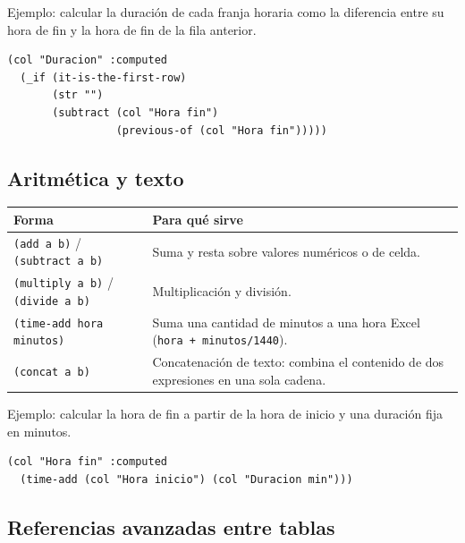\documentclass[12pt,a4paper]{report}
\begin{document}
Ejemplo: calcular la duración de cada franja horaria como la diferencia
entre su hora de fin y la hora de fin de la fila anterior.

\begin{lstlisting}
(col "Duracion" :computed
  (_if (it-is-the-first-row)
       (str "")
       (subtract (col "Hora fin")
                 (previous-of (col "Hora fin")))))
\end{lstlisting}

\subsection*{Aritmética y texto}

\begin{center}
\begin{tabular}{lp{8cm}}
\toprule
\textbf{Forma} & \textbf{Para qué sirve} \\
\midrule
\texttt{(add a b)} / \texttt{(subtract a b)} & Suma y resta sobre valores
  numéricos o de celda. \\
\texttt{(multiply a b)} / \texttt{(divide a b)} & Multiplicación y división. \\
\texttt{(time-add hora minutos)} & Suma una cantidad de minutos a una hora
  Excel (\texttt{hora + minutos/1440}). \\
\texttt{(concat a b)} & Concatenación de texto: combina el contenido de dos
  expresiones en una sola cadena. \\
\bottomrule
\end{tabular}
\end{center}

Ejemplo: calcular la hora de fin a partir de la hora de inicio y una
duración fija en minutos.

\begin{lstlisting}
(col "Hora fin" :computed
  (time-add (col "Hora inicio") (col "Duracion min")))
\end{lstlisting}

\subsection*{Referencias avanzadas entre tablas}
\end{document}
